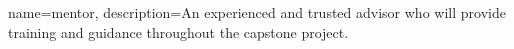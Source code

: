 \usepackage[toc,nopostdot,nonumberlist]{glossaries}

{%
  name={mentor},
  description={An experienced and trusted advisor who will provide training and guidance throughout the capstone project.}
}

\makeglossaries{}
